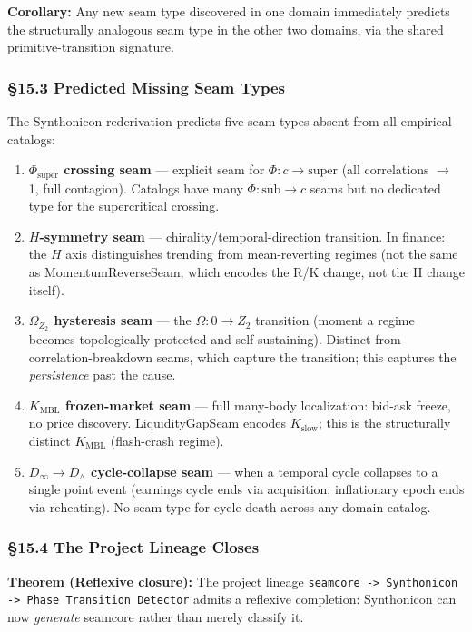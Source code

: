 \documentclass[12pt,a4paper]{article}
\newcommand{\pilcrow}{\S}
\begin{document}
\textbf{Corollary:} Any new seam type discovered in one domain immediately predicts the structurally analogous seam type in the other two domains, via the shared primitive-transition signature.

\subsubsection{\pilcrow{}15.3 Predicted Missing Seam Types}

The Synthonicon rederivation predicts five seam types absent from all empirical catalogs:

\begin{enumerate}
    \item \textbf{$\Phi_{\text{super}}$ crossing seam} --- explicit seam for $\Phi: c \to \text{super}$ (all correlations $\to$ 1, full contagion). Catalogs have many $\Phi: \text{sub} \to c$ seams but no dedicated type for the supercritical crossing.
    \item \textbf{$H$-symmetry seam} --- chirality/temporal-direction transition. In finance: the $H$ axis distinguishes trending from mean-reverting regimes (not the same as MomentumReverseSeam, which encodes the R/K change, not the H change itself).
    \item \textbf{$\Omega_{Z_2}$ hysteresis seam} --- the $\Omega: 0 \to Z_2$ transition (moment a regime becomes topologically protected and self-sustaining). Distinct from correlation-breakdown seams, which capture the transition; this captures the \emph{persistence} past the cause.
    \item \textbf{$K_{\text{MBL}}$ frozen-market seam} --- full many-body localization: bid-ask freeze, no price discovery. LiquidityGapSeam encodes $K_{\text{slow}}$; this is the structurally distinct $K_{\text{MBL}}$ (flash-crash regime).
    \item \textbf{$D_{\infty} \to D_{\wedge}$ cycle-collapse seam} --- when a temporal cycle collapses to a single point event (earnings cycle ends via acquisition; inflationary epoch ends via reheating). No seam type for cycle-death across any domain catalog.
\end{enumerate}

\subsubsection{\pilcrow{}15.4 The Project Lineage Closes}

\textbf{Theorem (Reflexive closure):} The project lineage \texttt{seamcore -\textgreater{} Synthonicon -\textgreater{} Phase Transition Detector} admits a reflexive completion: Synthonicon can now \emph{generate} seamcore rather than merely classify it.
\end{document}
